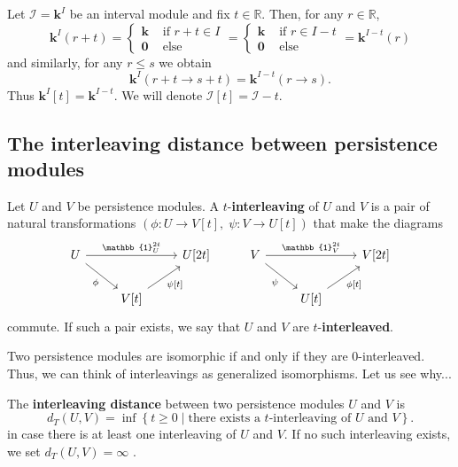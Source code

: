 \documentclass[11pt]{article}
\begin{document}
\begin{example}\label{ex:shifted.interval.module}
Let \(\mathcal{I}=\mathbf{k}^I\) be an interval module 
and fix \(t\in \mathbb{R}\).
Then, for any \(r\in \mathbb{R}\),
$$
\mathbf{k}^I(r+t) = \begin{cases}
\mathbf{k} &\text{ if }r+t\in I\\
\mathbf{0}&\text{ else }
\end{cases}
= 
\begin{cases}
\mathbf{k} &\text{ if }r \in I-t\\
\mathbf{0}&\text{ else }
\end{cases}
=
\mathbf{k}^{I-t}(r)
$$
and similarly, for any \(r\leq s\) we obtain $$ \mathbf{k}^I(r+t\to s+t) = \mathbf{k}^{I-t}(r\to s).$$
Thus $\mathbf{k}^I[t] =  \mathbf{k}^{I-t}$.
We will denote \(\mathcal{I}[t]=\mathcal{I}-t\).
\end{example}

\subsection{The interleaving distance between persistence modules}

Let \(U\) and \(V\) be persistence modules.
A \(t\)-\textbf{interleaving} of \(U\) and \(V\) is a pair of   natural transformations
\((\phi\colon U\to V[t], \; \psi\colon V\to U[t] )\)
that make the   diagrams 
$$
\begin{tikzcd}
U \arrow[rd, "\phi"'] \arrow[rr, "\mathbb{1}^{2t}_U"] &                                 & {U[2t]} & V \arrow[rd, "\psi"'] \arrow[rr, "\mathbb{1}^{2t}_V"] &                                 & {V[2t]} \\
                                                      & {V[t]} \arrow[ru, "{\psi[t]}"'] &         &                                                       & {U[t]} \arrow[ru, "{\phi[t]}"'] &        
\end{tikzcd}
$$
commute.
If such a pair exists, we say that \(U\) and \(V\) are \(t\)-\textbf{interleaved}.

\begin{example}
Two persistence modules are isomorphic if and only if they are \(0\)-interleaved.
Thus, we can think of interleavings as generalized isomorphisms.
Let us see why...
\end{example}

\begin{defi}
The  \textbf{interleaving distance} 
between two persistence modules \(U\) and \(V\) is
\[
d_T (U, V)=\inf \left\{t\geq 0 \mid \text {there exists a } t\text {-interleaving of } U \text { and } V\right\}.
\]
in case there is at least one interleaving of \(U\) and \(V\).
If no such interleaving exists, we set 
$d_T (U, V)= \infty$ .
\end{defi} 
\end{document}
